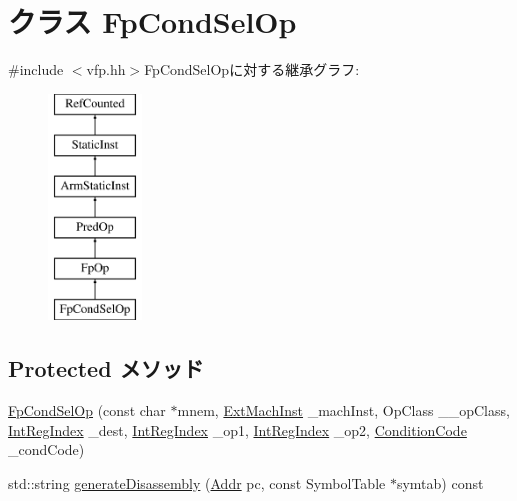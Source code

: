 \hypertarget{classArmISA_1_1FpCondSelOp}{
\section{クラス FpCondSelOp}
\label{classArmISA_1_1FpCondSelOp}
}


{\ttfamily \#include $<$vfp.hh$>$}FpCondSelOpに対する継承グラフ:\begin{figure}[H]
\begin{center}
\leavevmode
\includegraphics[height=6cm]{classArmISA_1_1FpCondSelOp}
\end{center}
\end{figure}
\subsection*{Protected メソッド}
\begin{DoxyCompactItemize}
\item 
\hyperlink{classArmISA_1_1FpCondSelOp_a9058c8be1aa295cfed2c9e8642767101}{FpCondSelOp} (const char $\ast$mnem, \hyperlink{classStaticInst_a5605d4fc727eae9e595325c90c0ec108}{ExtMachInst} \_\-machInst, OpClass \_\-\_\-opClass, \hyperlink{namespaceArmISA_ae64680ba9fb526106829d6bf92fc791b}{IntRegIndex} \_\-dest, \hyperlink{namespaceArmISA_ae64680ba9fb526106829d6bf92fc791b}{IntRegIndex} \_\-op1, \hyperlink{namespaceArmISA_ae64680ba9fb526106829d6bf92fc791b}{IntRegIndex} \_\-op2, \hyperlink{namespaceArmISA_ab8f08e777c4753720cff841f81da8e06}{ConditionCode} \_\-condCode)
\item 
std::string \hyperlink{classArmISA_1_1FpCondSelOp_a95d323a22a5f07e14d6b4c9385a91896}{generateDisassembly} (\hyperlink{classm5_1_1params_1_1Addr}{Addr} pc, const SymbolTable $\ast$symtab) const 
\end{DoxyCompactItemize}
